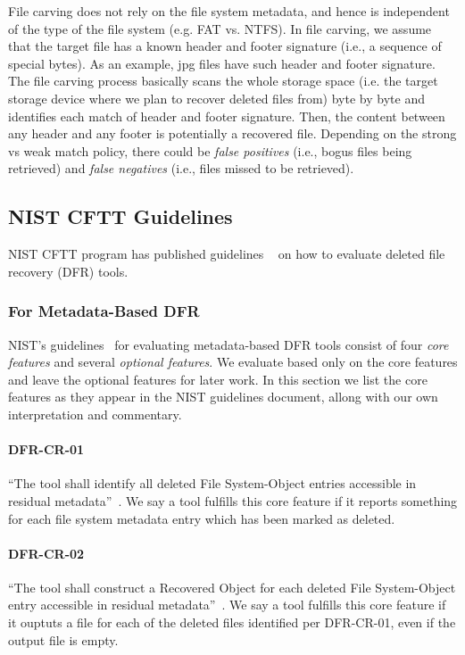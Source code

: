File carving does not rely on the file system metadata, and hence is independent of the type of the 
file system (e.g. FAT vs. NTFS). In file carving, we assume that the target file has 
a known header and footer signature (i.e., a sequence of special bytes). As an example, 
jpg files have such header and footer signature. The file carving process basically
scans the whole storage space (i.e. the target storage device where we plan to recover deleted files from) 
byte by byte and identifies each match of header and footer signature. 
Then, the content between any header and any footer is potentially a recovered file. 
Depending on the strong vs weak match policy, there could be \emph{false positives} 
(i.e., bogus files being retrieved) 
and \emph{false negatives} (i.e., files missed to be retrieved). 

\subsection{NIST CFTT Guidelines}
NIST CFTT program has published guidelines ~\cite{meta:dfr:standards,carving_standards} on how to evaluate deleted file recovery (DFR) tools.

\subsubsection{For Metadata-Based DFR}
NIST's guidelines~\cite{meta:dfr:standards} for evaluating metadata-based DFR tools consist of four \emph{core features} and several \emph{optional features}. We evaluate based only on the core features and leave the optional features for later work.
In this section we list the core features as they appear in the NIST guidelines document, allong with our own interpretation and commentary.

 \paragraph{DFR-CR-01} ``The tool shall identify all deleted File System-Object entries accessible in residual metadata''~\cite{meta:dfr:standards}.
 We say a tool fulfills this core feature if it reports something for each file system metadata entry which has been marked as deleted.
 
 \paragraph{DFR-CR-02} ``The tool shall construct a Recovered Object for each deleted File System-Object entry accessible in residual metadata''~\cite{meta:dfr:standards}.
 We say a tool fulfills this core feature if it ouptuts a file for each of the deleted files identified per DFR-CR-01, even if the output file is empty.

